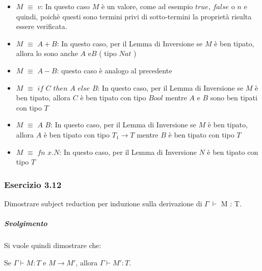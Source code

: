  
 \begin{itemize}[label=$\star$]

 \item $M$ $\equiv$ $v$:  In questo caso $M$ \`e un valore, come ad esempio $true$, $false$ o $n$ e quindi, poich\`e questi sono termini privi di sotto-termini la propriet\`a risulta essere verificata.

 \item $M$ $\equiv$ $A+B$:  In questo caso, per il Lemma di Inversione se $M$ \`e ben tipato, allora lo sono anche $A$ e$B$ ( tipo $Nat$ )
 
 \item $M$ $\equiv$ $A-B$:  questo caso \`e analogo al precedente

 \item $M$ $\equiv$ $if$ $C$ $then$ $A$ $else$ $B$:  In questo caso, per il Lemma di Inversione se $M$ \`e ben tipato, allora $C$ \`e ben tipato con tipo $Bool$ mentre $A$ e $B$ sono ben tipati con tipo $T$
 
  \item $M$ $\equiv$ $A$ $B$: In questo caso, per il Lemma di Inversione se $M$ \`e ben tipato, allora $A$ \`e ben tipato con tipo $T_1 \rightarrow T$ mentre $B$ \`e ben tipato con tipo $T$
  
    \item $M$ $\equiv$ $fn$ $x.N$: In questo caso, per il Lemma di Inversione $N$ \`e ben tipato con tipo $T$
 \end{itemize}
 
 
\subsubsection*{Esercizio 3.12} 
Dimostrare subject reduction per induzione sulla derivazione di $\Gamma\:\vdash$ M : T.

\subparagraph*{Svolgimento}

Si vuole quindi dimostrare che:

\begin{center}
	Se $\Gamma \vdash{} M : T$ e $M \to{} M'$, allora $\Gamma \vdash{} M' : T$.
\end{center}



